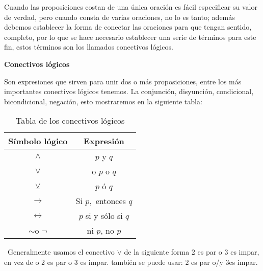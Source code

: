 Cuando las proposiciones costan de una única oración es fácil especificar
su valor de verdad, pero cuando consta de varias oraciones, no lo
es tanto; además debemos establecer la forma de conectar las oraciones
para que tengan sentido, completo, por lo que se hace necesario establecer
una serie de términos para este fin, estos términos son los llamados
conectivos lógicos.

\textsf{\textbf{Conectivos lógicos}}

Son expresiones que sirven para unir dos o más proposiciones, entre
los más importantes conectivos lógicos tenemos. La conjunción, disyunción,
condicional, bicondicional, negación, esto mostraremos en la siguiente
tabla:
\begin{table}[H]
\centering

\caption{Tabla de los conectivos lógicos}


\setlength\arrayrulewidth{1pt} 

\begin{tabular}{c|c}
\arrayrulecolor{ptctitle}\hline\cellcolor{ptctitle!50}Símbolo lógico & \cellcolor{ptctitle!50}Expresión\tabularnewline
\hline\cellcolor{ptcbackground}$\wedge$ & \cellcolor{ptcbackground}$p$ y $q$\tabularnewline
\hline\cellcolor{gray!50}$\vee$ & \cellcolor{gray!50}o $p$ o $q$\tabularnewline
\hline\cellcolor{ptcbackground}$\veebar$ & \cellcolor{ptcbackground}$p$ ó $q$\tabularnewline
\hline\cellcolor{gray!50}$\rightarrow$ & \cellcolor{gray!50}Si $p,$ entonces $q$\tabularnewline
\hline\cellcolor{ptcbackground}$\longleftrightarrow$ & \cellcolor{ptcbackground}$p$ si y sólo si $q$\tabularnewline
\hline\cellcolor{gray!50}$\sim$o $\neg$ & \cellcolor{gray!50}ni $p$, no $p$\tabularnewline
\hline 
\end{tabular}
\end{table}
 \nota\ Generalmente usamos el conectivo $\vee$ de la siguiente
forma 2 es par o 3 es impar, en vez de o 2 es par o 3 es impar. también
se puede usar: $2$ es par o/y $3$es impar.

